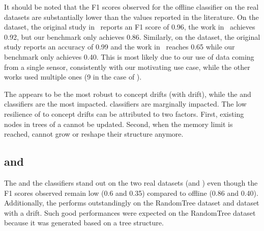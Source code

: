 It should be noted that the F1 scores observed for the offline \knn
classifier on the real datasets are substantially lower than the values
reported in the literature. On the \banosdataset dataset, the original
study in~\cite{Banos_2014} reports an F1 score of 0.96, the work
in~\cite{behzad2019} achieves 0.92, but our benchmark only achieves 0.86.
Similarly, on the \recofitdataset dataset, the original study reports an
accuracy of 0.99 and the
work in~\cite{behzad2019} reaches 0.65 while our benchmark only achieves
0.40. This is most likely due to our use of data coming from a single
sensor, consistently with our motivating use case, while the other works used
multiple ones (9 in the case of
\banosdataset).


The \hoeffdingtree appears to be the most robust to concept drifts
(\banosdataset with drift), while the \mondrianforest and \naivebayes
classifiers are the most impacted. \mcnn classifiers are marginally impacted.
The low resilience of \mondrianforest to concept drifts can be attributed to
two factors. First, existing nodes in trees of a \mondrianforest cannot be updated.
Second, when the memory limit is reached, \mondriantrees cannot grow
or reshape their structure anymore.


\subsection{\hoeffdingtree and \naivebayes}

The \naivebayes and the \hoeffdingtree classifiers stand out on the two real datasets
(\banosdataset and \recofitdataset) even though the F1 scores observed remain
low (0.6 and 0.35) compared to offline \knn (0.86 and 0.40). Additionally, the
\hoeffdingtree performs outstandingly on the RandomTree dataset and
\banosdataset dataset with a drift. Such good performances were expected on the
RandomTree dataset because it was generated based on a tree structure.

